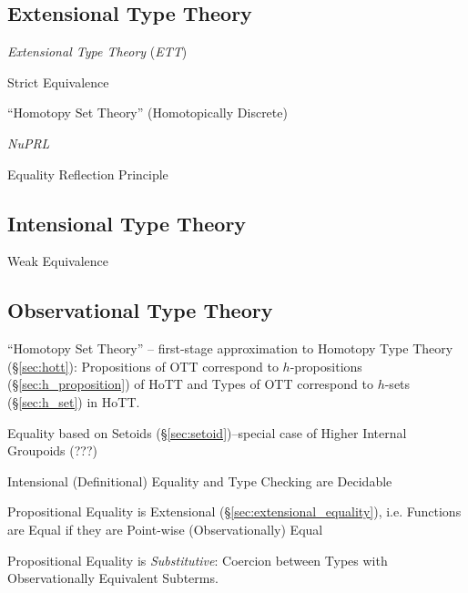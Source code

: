 \subsection{Extensional Type Theory}\label{sec:extensional_type}
\cite{harper12}

\emph{Extensional Type Theory} (\emph{ETT})

Strict Equivalence

``Homotopy Set Theory'' (Homotopically Discrete)

\emph{NuPRL}

Equality Reflection Principle



\subsection{Intensional Type Theory}\label{sec:intensional_type}
\cite{harper12}

Weak Equivalence



\subsection{Observational Type Theory}\label{sec:observational_type}

``Homotopy Set Theory'' -- first-stage approximation to Homotopy Type
Theory (\S\ref{sec:hott}): Propositions of OTT correspond to
$h$-propositions (\S\ref{sec:h_proposition}) of HoTT and Types of OTT
correspond to $h$-sets (\S\ref{sec:h_set}) in HoTT.

Equality based on Setoids (\S\ref{sec:setoid})--special case of Higher
Internal Groupoids (???)

Intensional (Definitional) Equality and Type Checking are Decidable

Propositional Equality is Extensional
(\S\ref{sec:extensional_equality}), i.e. Functions are Equal if they
are Point-wise (Observationally) Equal

Propositional Equality is \emph{Substitutive}: Coercion between Types
with Observationally Equivalent Subterms.

